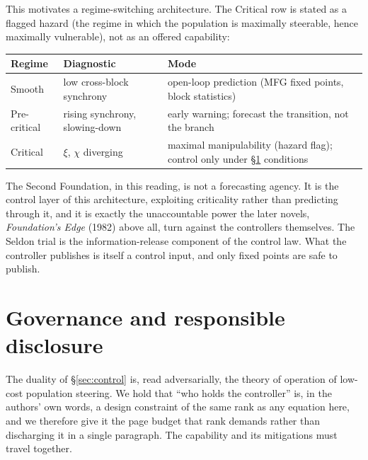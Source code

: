 \documentclass[11pt]{article}
\begin{document}
This motivates a regime-switching architecture. The Critical row is stated as a flagged hazard (the regime in which the population is maximally steerable, hence maximally vulnerable), not as an offered capability:
\begin{center}
\begin{tabular}{@{}lll@{}}
\toprule
\textbf{Regime} & \textbf{Diagnostic} & \textbf{Mode} \\
\midrule
Smooth & low cross-block synchrony & open-loop prediction (MFG fixed points, block statistics) \\
Pre-critical & rising synchrony, slowing-down & early warning; forecast the transition, not the branch \\
Critical & $\xi$, $\chi$ diverging & maximal manipulability (hazard flag); control only under \S\ref{sec:governance} conditions \\
\bottomrule
\end{tabular}
\end{center}
The Second Foundation, in this reading, is not a forecasting agency. It is the control layer of this architecture, exploiting criticality rather than predicting through it, and it is exactly the unaccountable power the later novels, \emph{Foundation's Edge} (1982) above all, turn against the controllers themselves. The Seldon trial is the information-release component of the control law. What the controller publishes is itself a control input, and only fixed points are safe to publish.

\section{Governance and responsible disclosure}
\label{sec:governance}

The duality of \S\ref{sec:control} is, read adversarially, the theory of operation of low-cost population steering. We hold that ``who holds the controller'' is, in the authors' own words, a design constraint of the same rank as any equation here, and we therefore give it the page budget that rank demands rather than discharging it in a single paragraph. The capability and its mitigations must travel together.
\end{document}
